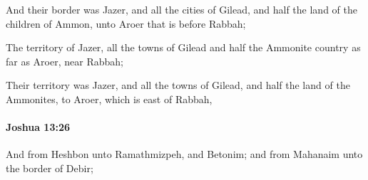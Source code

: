 			\begin{versebox}
					\item[BHS] 
					\item[ASV] And their border was Jazer, and all the cities of Gilead, and half the land of the children of Ammon, unto Aroer that is before Rabbah;
					\item[NIV] The territory of Jazer, all the towns of Gilead and half the Ammonite country as far as Aroer, near Rabbah;
					\item[NRSV] Their territory was Jazer, and all the towns of Gilead, and half the land of the Ammonites, to Aroer, which is east of Rabbah,
			\end{versebox}

		\paragraph{Joshua 13:26} %
			\label{JOSHUA-13-26}

			And from Heshbon unto Ramathmizpeh, and Betonim; and from Mahanaim unto the border of Debir;

